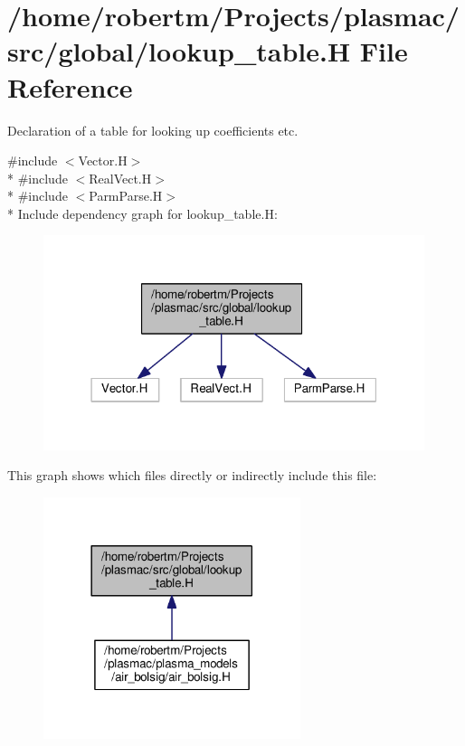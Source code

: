 \hypertarget{lookup__table_8H}{}\section{/home/robertm/\+Projects/plasmac/src/global/lookup\+\_\+table.H File Reference}
\label{lookup__table_8H}


Declaration of a table for looking up coefficients etc.  


{\ttfamily \#include $<$Vector.\+H$>$}\\*
{\ttfamily \#include $<$Real\+Vect.\+H$>$}\\*
{\ttfamily \#include $<$Parm\+Parse.\+H$>$}\\*
Include dependency graph for lookup\+\_\+table.\+H\+:\nopagebreak
\begin{figure}[H]
\begin{center}
\leavevmode
\includegraphics[width=316pt]{lookup__table_8H__incl}
\end{center}
\end{figure}
This graph shows which files directly or indirectly include this file\+:\nopagebreak
\begin{figure}[H]
\begin{center}
\leavevmode
\includegraphics[width=213pt]{lookup__table_8H__dep__incl}
\end{center}
\end{figure}
